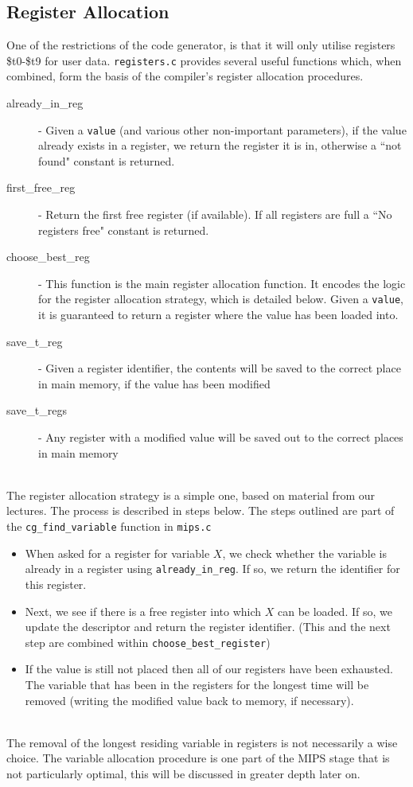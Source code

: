 \subsection{Register Allocation}
One of the restrictions of the code generator, is that it will only utilise registers \$t0-\$t9 for user data. \verb!registers.c! provides several useful functions which, when combined, form the basis of the compiler's register allocation procedures.

\begin{description}
	\item[already\_in\_reg] - Given a \verb!value! (and various other non-important parameters), if the value already exists in a register, we return the register it is in, otherwise a ``not found" constant is returned.
	\item[first\_free\_reg] - Return the first free register (if available). If all registers are full a ``No registers free" constant is returned. 
	\item[choose\_best\_reg] - This function is the main register allocation function. It encodes the logic for the register allocation strategy, which is detailed below. Given a \verb!value!, it is guaranteed to return a register where the value has been loaded into.
	\item[save\_t\_reg] - Given a register identifier, the contents will be saved to the correct place in main memory, if the value has been modified
	\item[save\_t\_regs] - Any register with a modified value will be saved out to the correct places in main memory
\end{description}
\ \\
The register allocation strategy is a simple one, based on material from our lectures. The process is described in steps below. The steps outlined are part of the \verb!cg_find_variable! function in \verb!mips.c!

\begin{itemize}
	\item When asked for a register for variable $X$, we check whether the variable is already in a register using \verb!already_in_reg!. If so, we return the identifier for this register.
	\item Next, we see if there is a free register into which $X$ can be loaded. If so, we update the descriptor and return the register identifier. (This and the next step are combined within \verb!choose_best_register!)
	\item If the value is still not placed then all of our registers have been exhausted. The variable that has been in the registers for the longest time will be removed (writing the modified value back to memory, if necessary).
\end{itemize}
\ \\
The removal of the longest residing variable in registers is not necessarily a wise choice. The variable allocation procedure is one part of the MIPS stage that is not particularly optimal, this will be discussed in greater depth later on.

